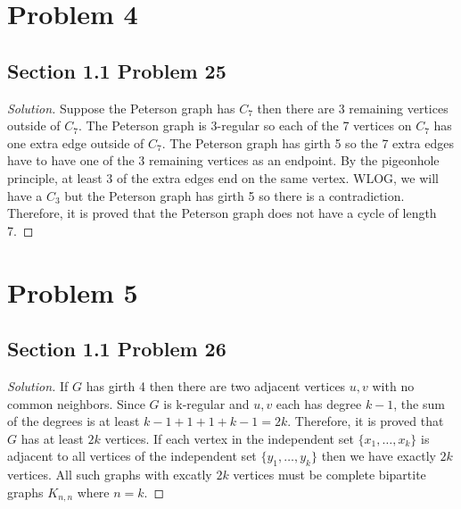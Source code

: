 \documentclass[12pt, letterpaper]{article}
\newenvironment{solution}{\begin{proof}[Solution]}{\end{proof}}
\begin{document}
\section*{Problem 4}
\subsection*{Section 1.1 Problem 25}
\begin{solution}
    Suppose the Peterson graph has \(C_7\) then there are 3 remaining vertices
    outside of \(C_7\). The Peterson graph is 3-regular so each of the 7
    vertices on \(C_7\) has one extra edge outside of \(C_7\). The Peterson
    graph has girth 5 so the 7 extra edges have to have one of the 3 remaining
    vertices as an endpoint. By the pigeonhole principle, at least 3 of the
    extra edges end on the same vertex. WLOG, we will have a \(C_3\) but the
    Peterson graph has girth 5 so there is a contradiction. Therefore, it is
    proved that the Peterson graph does not have a cycle of length 7.
\end{solution}

\section*{Problem 5}
\subsection*{Section 1.1 Problem 26}
\begin{solution}
    If \(G\) has girth 4 then there are two adjacent vertices \(u, v\) with no
    common neighbors. Since \(G\) is k-regular and \(u,v\) each has degree
    \(k-1\), the sum of the degrees is at least \(k-1+1+1+k-1=2k\). Therefore,
    it is proved that \(G\) has at least \(2k\) vertices. If each vertex in the
    independent set \(\{x_1,\dots,x_{k}\}\) is adjacent to all vertices of
    the independent set \(\{y_1,\dots,y_{k}\}\) then we have exactly \(2k\)
    vertices. All such graphs with excatly \(2k\) vertices must be complete
    bipartite graphs \(K_{n,n}\) where \(n=k\).
\end{solution}
\end{document}
